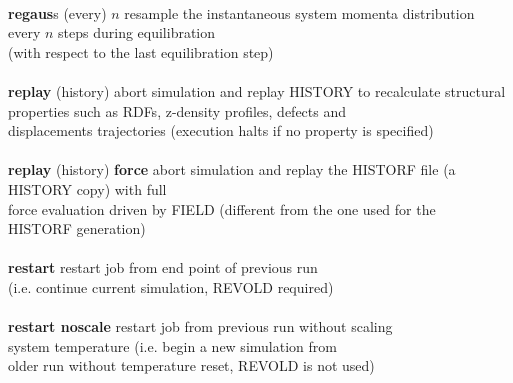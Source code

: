 \begin{tabbing}
\>                                              \> \\
\> {\bf regaus}s (every) $n$                    \> resample the instantaneous system momenta distribution \\
\>                                              \> every $n$ steps during equilibration \\
\>                                              \> (with respect to the last equilibration step) \\
\>                                              \> \\
\> {\bf replay} (history)                       \> abort simulation and replay HISTORY to recalculate structural \\
\>                                              \> properties such as RDFs, z-density profiles, defects and \\
\>                                              \> displacements trajectories (execution halts if no property is specified) \\
\>                                              \> \\
\> {\bf replay} (history) {\bf force}           \> abort simulation and replay the HISTORF file (a HISTORY copy) with full \\
\>                                              \> force evaluation driven by FIELD (different from the one used for the \\
\>                                              \> HISTORF generation) \\
\>                                              \> \\
\> {\bf restart}                                \> restart job from end point of previous run \\
\>                                              \> (i.e. continue current simulation, REVOLD required) \\
\>                                              \> \\
\> {\bf restart noscale}                        \> restart job from previous run without scaling \\
\>                                              \> system temperature (i.e. begin a new simulation from \\
\>                                              \> older run without temperature reset, REVOLD is not used) \\
\>                                              \> \\

\end{tabbing}
